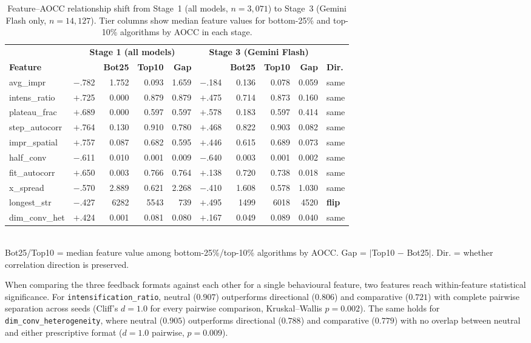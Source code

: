 \begin{table}[!t]
\centering
\caption{Feature--AOCC relationship shift from Stage~1 (all models, $n{=}3{,}071$) to Stage~3 (Gemini Flash only, $n{=}14{,}127$). Tier columns show median feature values for bottom-25\% and top-10\% algorithms by AOCC in each stage.}
\label{tab:correlation-shift}
\footnotesize
\begin{tabular}{@{}l|rrrr|rrrr|l@{}}
\toprule
& \multicolumn{4}{c|}{\textbf{Stage 1 (all models)}} & \multicolumn{4}{c|}{\textbf{Stage 3 (Gemini Flash)}} & \\
\textbf{Feature} & \boldmath{$\rho$} & \textbf{Bot25} & \textbf{Top10} & \textbf{Gap} & \boldmath{$\rho$} & \textbf{Bot25} & \textbf{Top10} & \textbf{Gap} & \textbf{Dir.} \\
\midrule
avg\_impr       & $-$.782 & 1.752 & 0.093 & 1.659 & $-$.184 & 0.136 & 0.078 & 0.059 & same \\
intens\_ratio   & $+$.725 & 0.000 & 0.879 & 0.879 & $+$.475 & 0.714 & 0.873 & 0.160 & same \\
plateau\_frac   & $+$.689 & 0.000 & 0.597 & 0.597 & $+$.578 & 0.183 & 0.597 & 0.414 & same \\
step\_autocorr  & $+$.764 & 0.130 & 0.910 & 0.780 & $+$.468 & 0.822 & 0.903 & 0.082 & same \\
impr\_spatial   & $+$.757 & 0.087 & 0.682 & 0.595 & $+$.446 & 0.615 & 0.689 & 0.073 & same \\
half\_conv      & $-$.611 & 0.010 & 0.001 & 0.009 & $-$.640 & 0.003 & 0.001 & 0.002 & same \\
fit\_autocorr   & $+$.650 & 0.003 & 0.766 & 0.764 & $+$.138 & 0.720 & 0.738 & 0.018 & same \\
x\_spread       & $-$.570 & 2.889 & 0.621 & 2.268 & $-$.410 & 1.608 & 0.578 & 1.030 & same \\
longest\_str    & $-$.427 & 6282  & 5543  & 739   & $+$.495 & 1499  & 6018  & 4520  & \textbf{flip} \\
dim\_conv\_het  & $+$.424 & 0.001 & 0.081 & 0.080 & $+$.167 & 0.049 & 0.089 & 0.040 & same \\
\bottomrule
\end{tabular}
\\[0.3em]
{\scriptsize Bot25/Top10 = median feature value among bottom-25\%/top-10\% algorithms by AOCC. Gap = $|$Top10 $-$ Bot25$|$. Dir. = whether correlation direction is preserved.}
\end{table}

When comparing the three feedback formats against each other for a single behavioural feature, two features reach within-feature statistical significance. For \texttt{intensification\_ratio}, neutral ($0.907$) outperforms directional ($0.806$) and comparative ($0.721$) with complete pairwise separation across seeds (Cliff's $d = 1.0$ for every pairwise comparison, Kruskal--Wallis $p = 0.002$). The same holds for \texttt{dim\_conv\_heterogeneity}, where neutral ($0.905$) outperforms directional ($0.788$) and comparative ($0.779$) with no overlap between neutral and either prescriptive format ($d = 1.0$ pairwise, $p = 0.009$).

